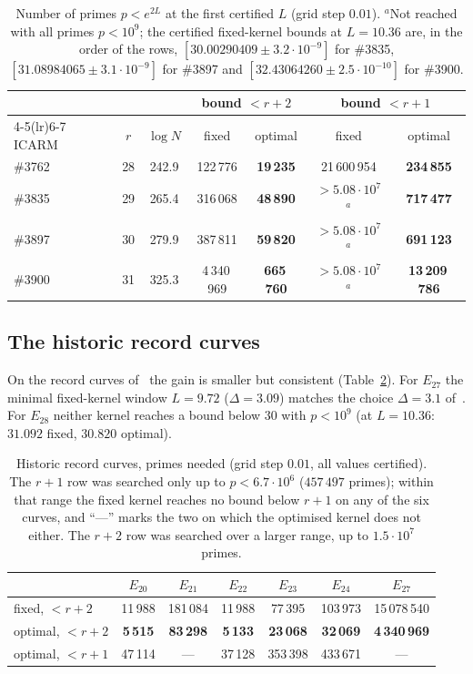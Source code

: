 \documentclass[11pt]{amsart}
\theoremstyle{remark}
\theoremstyle{definition}
\begin{document}
\begin{table}[h]
\centering\small
\begin{tabular}{lcccccc}
\toprule
 & & & \multicolumn{2}{c}{bound $<r+2$} & \multicolumn{2}{c}{bound $<r+1$}\\
\cmidrule(lr){4-5}\cmidrule(lr){6-7}
ICARM & $r$ & $\log N$ & fixed & optimal & fixed & optimal\\
\midrule
\#3762 & 28 & 242.9 & 122\,776 & \textbf{19\,235} & 21\,600\,954 & \textbf{234\,855}\\
\#3835 & 29 & 265.4 & 316\,068 & \textbf{48\,890} & $>5.08\cdot10^7$ $^{a}$ & \textbf{717\,477}\\
\#3897 & 30 & 279.9 & 387\,811 & \textbf{59\,820} & $>5.08\cdot10^7$ $^{a}$ & \textbf{691\,123}\\
\#3900 & 31 & 325.3 & 4\,340\,969 & \textbf{665\,760} & $>5.08\cdot10^7$ $^{a}$ & \textbf{13\,209\,786}\\
\bottomrule
\end{tabular}
\caption{Number of primes $p<e^{2L}$ at the first certified $L$ (grid step $0.01$). $^{a}$Not reached with all primes $p<10^9$; the certified fixed-kernel bounds at $L=10.36$ are, in the order of the rows, $[30.00290409\pm3.2\cdot10^{-9}]$ for \#3835, $[31.08984065\pm3.1\cdot10^{-9}]$ for \#3897 and $[32.43064260\pm2.5\cdot10^{-10}]$ for \#3900.}
\label{tab:icarm}
\end{table}

\subsection*{The historic record curves}
On the record curves of~\cite{Bober,KSW} the gain is smaller but consistent (Table~\ref{tab:historic}). For $E_{27}$ the minimal fixed-kernel window $L=9.72$ ($\Delta=3.09$) matches the choice $\Delta=3.1$ of~\cite{KSW}. For $E_{28}$ neither kernel reaches a bound below $30$ with $p<10^9$ (at $L=10.36$: $31.092$ fixed, $30.820$ optimal).

\begin{table}[h]
\centering\small
\begin{tabular}{lcccccc}
\toprule
 & $E_{20}$ & $E_{21}$ & $E_{22}$ & $E_{23}$ & $E_{24}$ & $E_{27}$\\
\midrule
fixed, $<r+2$ & 11\,988 & 181\,084 & 11\,988 & 77\,395 & 103\,973 & 15\,078\,540\\
optimal, $<r+2$ & \textbf{5\,515} & \textbf{83\,298} & \textbf{5\,133} & \textbf{23\,068} & \textbf{32\,069} & \textbf{4\,340\,969}\\
optimal, $<r+1$ & 47\,114 & --- & 37\,128 & 353\,398 & 433\,671 & ---\\
\bottomrule
\end{tabular}
\caption{Historic record curves, primes needed (grid step $0.01$, all values certified). The $r+1$ row was
searched only up to $p<6.7\cdot10^6$ ($457\,497$ primes); within that range the fixed kernel reaches no
bound below $r+1$ on any of the six curves, and ``---'' marks the two on which the optimised kernel does
not either. The $r+2$ row was searched over a larger range, up to $1.5\cdot10^7$ primes.}
\label{tab:historic}
\end{table}
\end{document}
